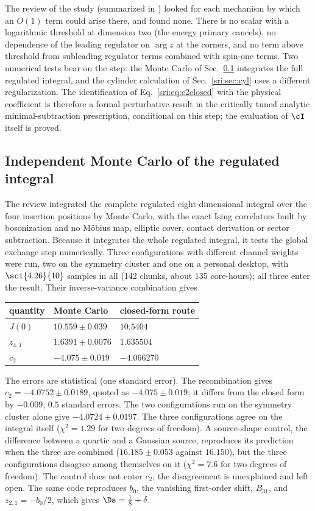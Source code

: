 The review of the study (summarized in ) looked for each mechanism by which an
$O(1)$ term could arise there, and found none. There is no scalar with a logarithmic threshold at dimension two (the energy
primary cancels), no dependence of the leading regulator on $\arg z$ at the corners, and no term above threshold from
subleading regulator terms combined with spin-one terms. Two numerical tests bear on the step: the Monte Carlo of
Sec.~\ref{sri:sec:mc} integrates the full regulated integral, and the cylinder calculation of Sec.~\ref{sri:sec:cyl} uses a
different regularization. The identification of Eq.~\eqref{sri:eq:c2closed} with the physical coefficient is therefore a
formal perturbative result in the critically tuned analytic minimal-subtraction prescription, conditional on this
step; the evaluation of $\cI$ itself is proved.

\subsection{Independent Monte Carlo of the regulated integral}\label{sri:sec:mc}
The review integrated the complete regulated eight-dimensional integral over the four insertion positions by Monte
Carlo, with the exact Ising correlators built by bosonization and no M\"obius map, elliptic cover, contact derivation
or sector subtraction. Because it integrates the whole regulated integral, it tests the global exchange step
numerically. Three configurations with different channel weights were run, two on the symmetry cluster and one on a
personal desktop, with $\sci{4.26}{10}$ samples in all (142 chunks, about 135 core-hours); all three enter the
result. Their inverse-variance combination gives
\begin{center}\small
\begin{tabular}{@{}lll@{}}
\toprule
quantity & Monte Carlo & closed-form route\\
\midrule
$J(0)$ & $10.559\pm0.039$ & $10.5404$\\
$z_{4,1}$ & $1.6391\pm0.0076$ & $1.635504$\\
$c_2$ & $-4.075\pm0.019$ & $-4.066270$\\
\bottomrule
\end{tabular}
\end{center}
The errors are statistical (one standard error). The recombination gives $c_2=-4.0752\pm0.0189$, quoted as
$-4.075\pm0.019$; it differs from the closed form by $-0.009$, $0.5$ standard errors. The two configurations run on
the symmetry cluster alone give $-4.0724\pm0.0197$. The three configurations agree on the integral itself ($\chi^2=1.29$
for two degrees of freedom). A source-shape control, the difference between a quartic and a Gaussian source,
reproduces its prediction when the three are combined ($16.185\pm0.053$ against $16.150$), but the three
configurations disagree among themselves on it ($\chi^2=7.6$ for two degrees of freedom). The control does not enter
$c_2$; the disagreement is unexplained and left open. The same code reproduces $b_0$, the vanishing first-order shift,
$B_{31}$, and $z_{2,1}=-b_0/2$, which gives $\Ds=\frac18+\delta$.

